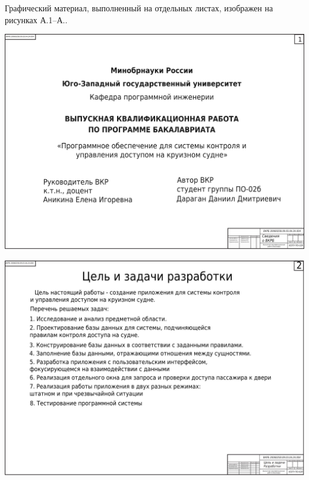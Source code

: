 
Графический материал, выполненный на отдельных листах,
изображен на рисунках А.1--А..
\setcounter{числоПлакатов}{0}

\renewcommand{\thefigure}{А.\arabic{figure}} %

\begin{landscape}
	
\begin{плакат}
	\includegraphics[width=0.82\linewidth]{images/плакат1.png}
	\label{fig:1}
\end{плакат}

\begin{плакат}
	\includegraphics[width=0.82\linewidth]{images/плакат2.png}
	\label{fig:2}
\end{плакат}


\end{landscape}
